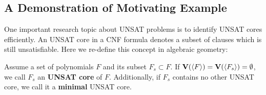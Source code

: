 \subsection{A Demonstration of Motivating Example}
One  important research topic about UNSAT problems is to identify UNSAT cores efficiently.
An UNSAT core in a CNF formula denotes a subset of clauses which is still unsatisfiable. Here
we re-define this concept in algebraic geometry:
\begin{Definition}
Assume a set of polynomials $F$ and its subset $F_s\subset F$. If ${\bf V}(\langle F\rangle) = {\bf V}
(\langle F_s\rangle) = \emptyset$, we call $F_s$ an {\bf UNSAT core} of $F$. Additionally, if
$F_s$ contains no other UNSAT core, we call it a {\bf minimal} UNSAT core.
\end{Definition}

